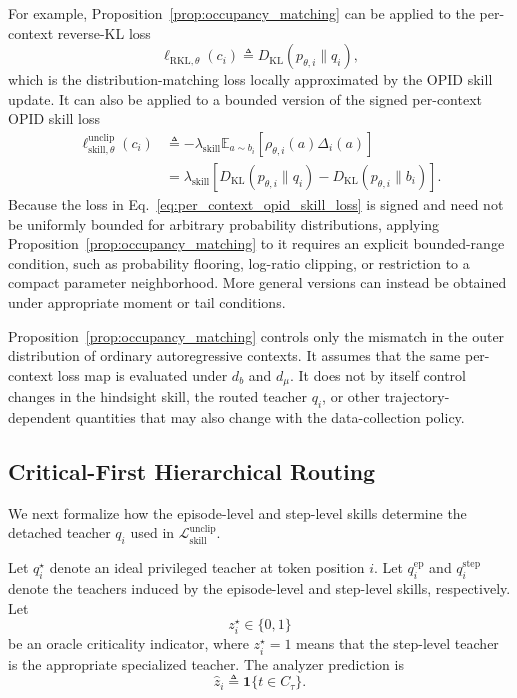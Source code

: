 For example, Proposition~\ref{prop:occupancy_matching} can be applied to
the per-context reverse-KL loss
\begin{equation*}
 \ell_{\mathrm{RKL},\theta}(c_i)
 \triangleq
 D_{\mathrm{KL}}
 \left(
   p_{\theta,i}\|q_i
 \right),
\end{equation*}
which is the distribution-matching loss locally approximated by the OPID
skill update. It can also be applied to a bounded version of the signed
per-context OPID skill loss
\begin{equation}
\begin{aligned}
 \ell_{\mathrm{skill},\theta}^{\mathrm{unclip}}(c_i)
 &\triangleq
 -
 \lambda_{\mathrm{skill}}
 \mathbb E_{a\sim b_i}
 \left[
   \rho_{\theta,i}(a)\Delta_i(a)
 \right]
 \\
 &=
 \lambda_{\mathrm{skill}}
 \left[
   D_{\mathrm{KL}}
   \left(
     p_{\theta,i}\|q_i
   \right)
   -
   D_{\mathrm{KL}}
   \left(
     p_{\theta,i}\|b_i
   \right)
 \right].
\end{aligned}
\label{eq:per_context_opid_skill_loss}
\end{equation}
Because the loss in Eq.~\ref{eq:per_context_opid_skill_loss} is signed
and need not be uniformly bounded for arbitrary probability distributions,
applying Proposition~\ref{prop:occupancy_matching} to it requires an
explicit bounded-range condition, such as probability flooring, log-ratio
clipping, or restriction to a compact parameter neighborhood. More general
versions can instead be obtained under appropriate moment or tail
conditions.

Proposition~\ref{prop:occupancy_matching} controls only the mismatch in the
outer distribution of ordinary autoregressive contexts. It assumes that
the same per-context loss map is evaluated under \(d_b\) and \(d_\mu\).
It does not by itself control changes in the hindsight skill, the routed
teacher \(q_i\), or other trajectory-dependent quantities that may also
change with the data-collection policy.
\subsection{Critical-First Hierarchical Routing}
\label{app:routing}

We next formalize how the episode-level and step-level skills determine the
detached teacher \(q_i\) used in
\(\mathcal L_{\mathrm{skill}}^{\mathrm{unclip}}\).

Let \(q_i^\star\) denote an ideal privileged teacher at token position
\(i\). Let \(q_i^{\mathrm{ep}}\) and \(q_i^{\mathrm{step}}\) denote the
teachers induced by the episode-level and step-level skills, respectively.
Let
\begin{equation*}
 z_i^\star\in\{0,1\}
\end{equation*}
be an oracle criticality indicator, where \(z_i^\star=1\) means that the
step-level teacher is the appropriate specialized teacher. The analyzer
prediction is
\begin{equation*}
 \widehat z_i
 \triangleq
 \mathbf 1\{t\in C_\tau\}.
\end{equation*}


